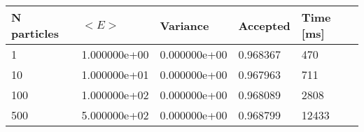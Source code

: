 \begin{table}[h!]
\begin{tabular}{|l|l|l|l|l|}
\hline 
N particles & $<E>$ & Variance & Accepted & Time [ms]\\ 
 \hline 
1 & 1.000000e+00 & 0.000000e+00 & 0.968367 & 470 \\ \hline 
10 & 1.000000e+01 & 0.000000e+00 & 0.967963 & 711 \\ \hline 
100 & 1.000000e+02 & 0.000000e+00 & 0.968089 & 2808 \\ \hline 
500 & 5.000000e+02 & 0.000000e+00 & 0.968799 & 12433 \\ \hline 
\end{tabular}
\label{h:a2} 
\end{table}
